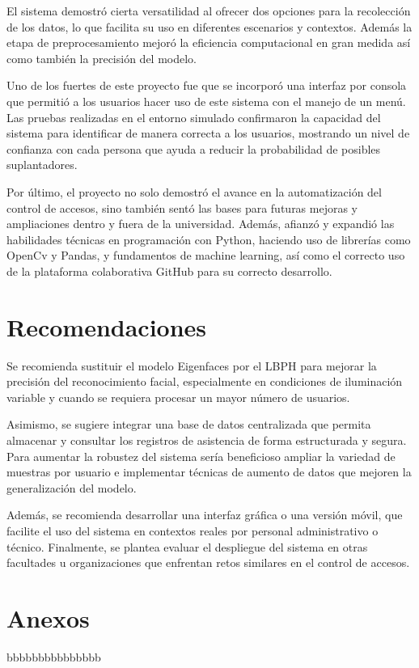 \documentclass[12pt]{article}
\begin{document}
{El sistema demostró cierta versatilidad al ofrecer dos opciones para la recolección de los datos, lo que facilita su uso en diferentes escenarios y contextos. Además la etapa de preprocesamiento mejoró la eficiencia computacional en gran medida así como también la precisión del modelo.

Uno de los fuertes de este proyecto fue que se incorporó una interfaz por consola que permitió a los usuarios hacer uso de este sistema con el manejo de un menú. Las pruebas realizadas en el entorno simulado confirmaron la capacidad del sistema para identificar de manera correcta a los usuarios, mostrando un nivel de confianza con cada persona que ayuda a reducir la probabilidad de posibles suplantadores.

Por último, el proyecto no solo demostró el avance en la automatización del control de accesos, sino también sentó las bases para futuras mejoras y ampliaciones dentro y fuera de la universidad. Además, afianzó y expandió las habilidades técnicas en programación con Python, haciendo uso de librerías como OpenCv y Pandas, y fundamentos de machine learning, así como el correcto uso de la plataforma colaborativa GitHub para su correcto desarrollo.


\section{Recomendaciones}
Se recomienda sustituir el modelo Eigenfaces por el LBPH para mejorar la precisión del reconocimiento facial, especialmente en condiciones de iluminación variable y cuando se requiera procesar un mayor número de usuarios.

Asimismo, se sugiere integrar una base de datos centralizada que permita almacenar y consultar los registros de asistencia de forma estructurada y segura. Para aumentar la robustez del sistema sería beneficioso ampliar la variedad de muestras por usuario e implementar técnicas de aumento de datos que mejoren la generalización del modelo.

Además, se recomienda desarrollar una interfaz gráfica o una versión móvil, que facilite el uso del sistema en contextos reales por personal administrativo o técnico. Finalmente, se plantea evaluar el despliegue del sistema en otras facultades u organizaciones que enfrentan retos similares en el control de accesos.


\section{Anexos}
bbbbbbbbbbbbbbb




}
\end{document}
